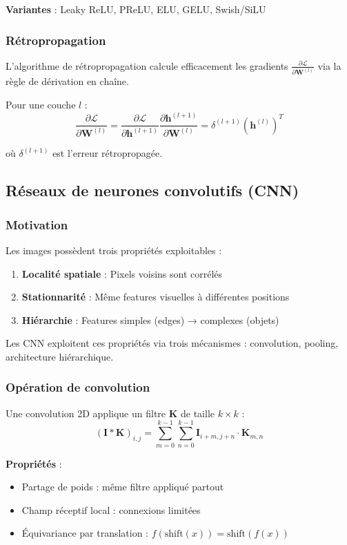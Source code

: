 \textbf{Variantes} : Leaky ReLU, PReLU, ELU, GELU, Swish/SiLU

\subsubsection{Rétropropagation}

L'algorithme de rétropropagation calcule efficacement les gradients $\frac{\partial \mathcal{L}}{\partial \mathbf{W}^{(l)}}$ via la règle de dérivation en chaîne.

Pour une couche $l$ :
\[
\frac{\partial \mathcal{L}}{\partial \mathbf{W}^{(l)}} = \frac{\partial \mathcal{L}}{\partial \mathbf{h}^{(l+1)}} \frac{\partial \mathbf{h}^{(l+1)}}{\partial \mathbf{W}^{(l)}} = \delta^{(l+1)} (\mathbf{h}^{(l)})^T
\]

où $\delta^{(l+1)}$ est l'erreur rétropropagée.

\subsection{Réseaux de neurones convolutifs (CNN)}

\subsubsection{Motivation}

Les images possèdent trois propriétés exploitables :
\begin{enumerate}
    \item \textbf{Localité spatiale} : Pixels voisins sont corrélés
    \item \textbf{Stationnarité} : Même features visuelles à différentes positions
    \item \textbf{Hiérarchie} : Features simples (edges) → complexes (objets)
\end{enumerate}

Les CNN exploitent ces propriétés via trois mécanismes : convolution, pooling, architecture hiérarchique.

\subsubsection{Opération de convolution}

Une convolution 2D applique un filtre $\mathbf{K}$ de taille $k \times k$ :
\[
(\mathbf{I} * \mathbf{K})_{i,j} = \sum_{m=0}^{k-1} \sum_{n=0}^{k-1} \mathbf{I}_{i+m, j+n} \cdot \mathbf{K}_{m,n}
\]

\textbf{Propriétés} :
\begin{itemize}
    \item Partage de poids : même filtre appliqué partout
    \item Champ réceptif local : connexions limitées
    \item Équivariance par translation : $f(\text{shift}(x)) = \text{shift}(f(x))$
\end{itemize}

